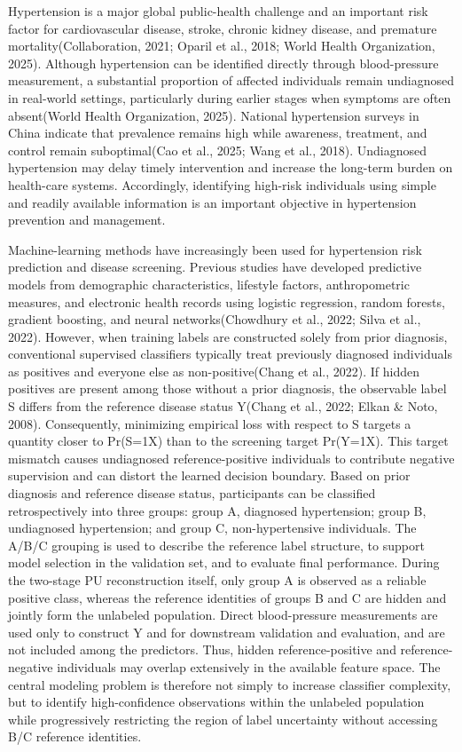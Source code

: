 \documentclass[10pt]{article}
\begin{document}
Hypertension is a major global public-health challenge and an important
risk factor for cardiovascular disease, stroke, chronic kidney disease,
and premature mortality(Collaboration, 2021; Oparil et al., 2018; World
Health Organization, 2025). Although hypertension can be identified
directly through blood-pressure measurement, a substantial proportion of
affected individuals remain undiagnosed in real-world settings,
particularly during earlier stages when symptoms are often absent(World
Health Organization, 2025). National hypertension surveys in China
indicate that prevalence remains high while awareness, treatment, and
control remain suboptimal(Cao et al., 2025; Wang et al., 2018).
Undiagnosed hypertension may delay timely intervention and increase the
long-term burden on health-care systems. Accordingly, identifying
high-risk individuals using simple and readily available information is
an important objective in hypertension prevention and management.

Machine-learning methods have increasingly been used for hypertension
risk prediction and disease screening. Previous studies have developed
predictive models from demographic characteristics, lifestyle factors,
anthropometric measures, and electronic health records using logistic
regression, random forests, gradient boosting, and neural
networks(Chowdhury et al., 2022; Silva et al., 2022). However, when
training labels are constructed solely from prior diagnosis,
conventional supervised classifiers typically treat previously diagnosed
individuals as positives and everyone else as non-positive(Chang et al.,
2022). If hidden positives are present among those without a prior
diagnosis, the observable label S differs from the reference disease
status Y(Chang et al., 2022; Elkan \& Noto, 2008). Consequently,
minimizing empirical loss with respect to S targets a quantity closer to
Pr(S=1\textbar X) than to the screening target Pr(Y=1\textbar X). This
target mismatch causes undiagnosed reference-positive individuals to
contribute negative supervision and can distort the learned decision
boundary. Based on prior diagnosis and reference disease status,
participants can be classified retrospectively into three groups: group
A, diagnosed hypertension; group B, undiagnosed hypertension; and group
C, non-hypertensive individuals. The A/B/C grouping is used to describe
the reference label structure, to support model selection in the
validation set, and to evaluate final performance. During the two-stage
PU reconstruction itself, only group A is observed as a reliable
positive class, whereas the reference identities of groups B and C are
hidden and jointly form the unlabeled population. Direct blood-pressure
measurements are used only to construct Y and for downstream validation
and evaluation, and are not included among the predictors. Thus, hidden
reference-positive and reference-negative individuals may overlap
extensively in the available feature space. The central modeling problem
is therefore not simply to increase classifier complexity, but to
identify high-confidence observations within the unlabeled population
while progressively restricting the region of label uncertainty without
accessing B/C reference identities.
\end{document}
